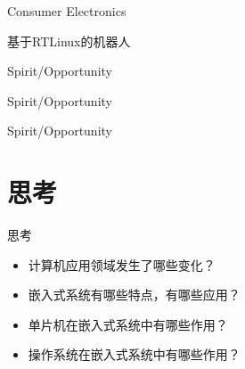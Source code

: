 \begin{frame}{Consumer Electronics}
\begin{center}\end{center}
\end{frame}

\begin{frame}{基于RTLinux的机器人}
\begin{center}\end{center}
\end{frame}

\begin{frame}{Spirit/Opportunity}
\begin{center}\end{center}
\end{frame}
\begin{frame}{Spirit/Opportunity}
\begin{center}\end{center}
\end{frame}
\begin{frame}{Spirit/Opportunity}
\begin{center}\end{center}
\end{frame}


\section{思考}
\begin{frame}{思考}
\begin{itemize}
\item 计算机应用领域发生了哪些变化？
\item 嵌入式系统有哪些特点，有哪些应用？
\item 单片机在嵌入式系统中有哪些作用？
\item 操作系统在嵌入式系统中有哪些作用？
\end{itemize}
\end{frame}



